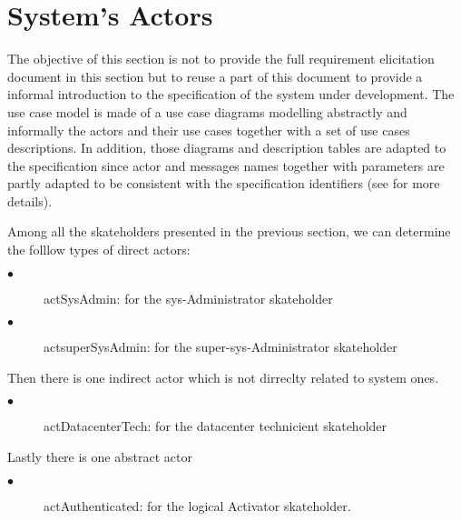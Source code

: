 \section{System's Actors}
\label{sec:icrash-gendescr-actors}
The objective of this section is not to provide the full requirement
elicitation document in this section but to reuse a part of this document to
provide a informal introduction to the \msrmessir specification of the system
under development. The use case model is made of a use case diagrams modelling
abstractly and informally the actors and their use cases together with a set of
use cases descriptions.
In addition, those diagrams and description tables are adapted to the
\msrmessir specification since actor and messages names together with
parameters are partly adapted to be consistent with the specification
identifiers (see \cite{messirbook} for more details).

Among all the skateholders presented in the previous section, we can determine
the folllow types of direct actors:
\begin{description}
\item[$\bullet$] actSysAdmin: for the sys-Administrator skateholder
\item[$\bullet$] actsuperSysAdmin: for the super-sys-Administrator skateholder
\end{description}	
Then there is one indirect actor which is not dirreclty related to system ones.
\begin{description}
\item[$\bullet$] actDatacenterTech: for the datacenter technicient skateholder
\end{description}
Lastly there is one abstract actor
\begin{description}
\item[$\bullet$] actAuthenticated: for the logical Activator skateholder.
\end{description}
\newpage